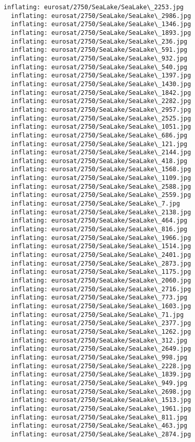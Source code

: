 \documentclass[11pt]{article}
\begin{document}
\begin{Verbatim}[commandchars=\\\{\}]
  inflating: eurosat/2750/SeaLake/SeaLake\_2253.jpg
  inflating: eurosat/2750/SeaLake/SeaLake\_2986.jpg
  inflating: eurosat/2750/SeaLake/SeaLake\_1346.jpg
  inflating: eurosat/2750/SeaLake/SeaLake\_1893.jpg
  inflating: eurosat/2750/SeaLake/SeaLake\_236.jpg
  inflating: eurosat/2750/SeaLake/SeaLake\_591.jpg
  inflating: eurosat/2750/SeaLake/SeaLake\_932.jpg
  inflating: eurosat/2750/SeaLake/SeaLake\_540.jpg
  inflating: eurosat/2750/SeaLake/SeaLake\_1397.jpg
  inflating: eurosat/2750/SeaLake/SeaLake\_1430.jpg
  inflating: eurosat/2750/SeaLake/SeaLake\_1842.jpg
  inflating: eurosat/2750/SeaLake/SeaLake\_2282.jpg
  inflating: eurosat/2750/SeaLake/SeaLake\_2957.jpg
  inflating: eurosat/2750/SeaLake/SeaLake\_2525.jpg
  inflating: eurosat/2750/SeaLake/SeaLake\_1051.jpg
  inflating: eurosat/2750/SeaLake/SeaLake\_686.jpg
  inflating: eurosat/2750/SeaLake/SeaLake\_121.jpg
  inflating: eurosat/2750/SeaLake/SeaLake\_2144.jpg
  inflating: eurosat/2750/SeaLake/SeaLake\_418.jpg
  inflating: eurosat/2750/SeaLake/SeaLake\_1568.jpg
  inflating: eurosat/2750/SeaLake/SeaLake\_1109.jpg
  inflating: eurosat/2750/SeaLake/SeaLake\_2588.jpg
  inflating: eurosat/2750/SeaLake/SeaLake\_2559.jpg
  inflating: eurosat/2750/SeaLake/SeaLake\_7.jpg
  inflating: eurosat/2750/SeaLake/SeaLake\_2138.jpg
  inflating: eurosat/2750/SeaLake/SeaLake\_464.jpg
  inflating: eurosat/2750/SeaLake/SeaLake\_816.jpg
  inflating: eurosat/2750/SeaLake/SeaLake\_1966.jpg
  inflating: eurosat/2750/SeaLake/SeaLake\_1514.jpg
  inflating: eurosat/2750/SeaLake/SeaLake\_2401.jpg
  inflating: eurosat/2750/SeaLake/SeaLake\_2873.jpg
  inflating: eurosat/2750/SeaLake/SeaLake\_1175.jpg
  inflating: eurosat/2750/SeaLake/SeaLake\_2060.jpg
  inflating: eurosat/2750/SeaLake/SeaLake\_2716.jpg
  inflating: eurosat/2750/SeaLake/SeaLake\_773.jpg
  inflating: eurosat/2750/SeaLake/SeaLake\_1603.jpg
  inflating: eurosat/2750/SeaLake/SeaLake\_71.jpg
  inflating: eurosat/2750/SeaLake/SeaLake\_2377.jpg
  inflating: eurosat/2750/SeaLake/SeaLake\_1262.jpg
  inflating: eurosat/2750/SeaLake/SeaLake\_312.jpg
  inflating: eurosat/2750/SeaLake/SeaLake\_2649.jpg
  inflating: eurosat/2750/SeaLake/SeaLake\_998.jpg
  inflating: eurosat/2750/SeaLake/SeaLake\_2228.jpg
  inflating: eurosat/2750/SeaLake/SeaLake\_1839.jpg
  inflating: eurosat/2750/SeaLake/SeaLake\_949.jpg
  inflating: eurosat/2750/SeaLake/SeaLake\_2698.jpg
  inflating: eurosat/2750/SeaLake/SeaLake\_1513.jpg
  inflating: eurosat/2750/SeaLake/SeaLake\_1961.jpg
  inflating: eurosat/2750/SeaLake/SeaLake\_811.jpg
  inflating: eurosat/2750/SeaLake/SeaLake\_463.jpg
  inflating: eurosat/2750/SeaLake/SeaLake\_2874.jpg

\end{Verbatim}
\end{document}
